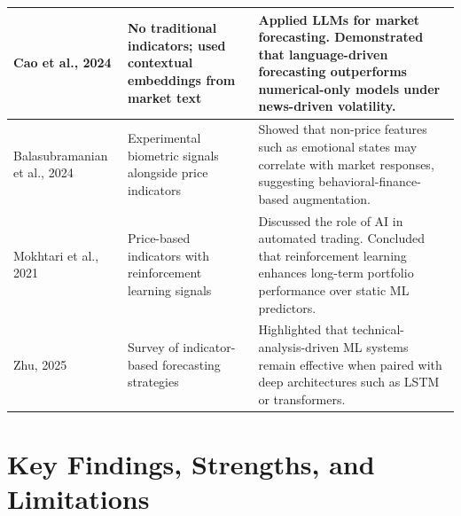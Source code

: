 \begin{small}
\begin{longtable}{|p{3.2cm}|p{4.5cm}|p{7.2cm}|}
Cao et al., 2024 \cite{Cao2024LLMStock} &
No traditional indicators; used contextual embeddings from market text &
Applied LLMs for market forecasting. Demonstrated that language-driven forecasting outperforms numerical-only models under news-driven volatility. \\ \hline

Balasubramanian et al., 2024 \cite{Balasubramanian2024StockMarketAnalysis} &
Experimental biometric signals alongside price indicators &
Showed that non-price features such as emotional states may correlate with market responses, suggesting behavioral-finance-based augmentation. \\ \hline

Mokhtari et al., 2021 \cite{Mokhtari2021ImpactOfAI} &
Price-based indicators with reinforcement learning signals &
Discussed the role of AI in automated trading. Concluded that reinforcement learning enhances long-term portfolio performance over static ML predictors. \\ \hline

Zhu, 2025 \cite{Zhu2025StockPredictionReview} &
Survey of indicator-based forecasting strategies &
Highlighted that technical-analysis-driven ML systems remain effective when paired with deep architectures such as LSTM or transformers. \\ \hline

\end{longtable}
\end{small}


\FloatBarrier
\clearpage

\section{Key Findings, Strengths, and Limitations}
\FloatBarrier

